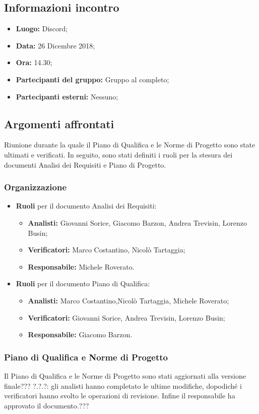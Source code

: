 \subsection{Informazioni incontro}
\begin{itemize}
	\item { \textbf{Luogo:} Discord;  }
	\item { \textbf{Data:} 26 Dicembre 2018; }
	\item { \textbf{Ora:} 14.30; }
	\item { \textbf{Partecipanti del gruppo:} Gruppo al completo; }
	\item { \textbf{Partecipanti esterni:} Nessuno; }
\end{itemize}


\subsection{Argomenti affrontati}
Riunione durante la quale il Piano di Qualifica e le Norme di Progetto sono state ultimati e verificati. In seguito, sono stati definiti i ruoli per la stesura dei documenti Analisi dei Requisiti e Piano di Progetto.

\subsubsection{Organizzazione}
\begin{itemize}
	\item { \textbf{Ruoli} per il documento Analisi dei Requisiti:} 
	\begin{itemize}
		\item { \textbf{Analisti:} Giovanni Sorice, Giacomo Barzon, Andrea Trevisin, Lorenzo Busin;}
		\item { \textbf{Verificatori:} Marco Costantino, Nicolò Tartaggia;}
		\item { \textbf{Responsabile:} Michele Roverato.} \\
	\end{itemize}
	\item { \textbf{Ruoli} per il documento Piano di Qualifica:} 
	\begin{itemize}
		\item { \textbf{Analisti:} Marco Costantino,Nicolò Tartaggia, Michele Roverato;}
		\item { \textbf{Verificatori:} Giovanni Sorice, Andrea Trevisin, Lorenzo Busin;}
		\item { \textbf{Responsabile:}  Giacomo Barzon.}
	\end{itemize}
\end{itemize}

\subsubsection{Piano di Qualifica e Norme di Progetto}
Il Piano di Qualifica e le Norme di Progetto sono stati aggiornati alla versione finale??? ?.?.?: gli analisti hanno completato le ultime modifiche, dopodiché i verificatori hanno svolto le operazioni di revisione. Infine il responsabile ha approvato il documento.???
